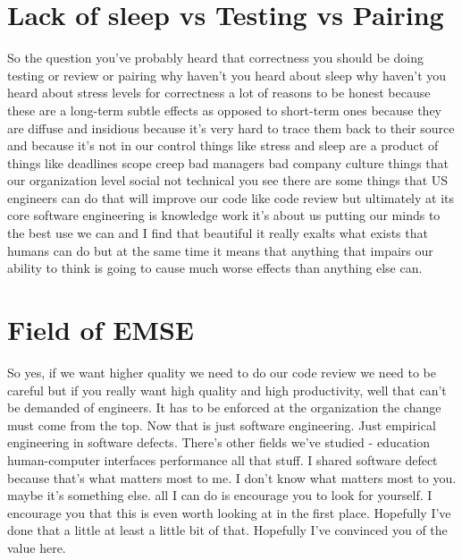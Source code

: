 \documentclass[conference, compsoc, twoside]{IEEEtran}
\begin{document}
\section{Lack of sleep vs Testing vs Pairing}
So the question you've probably heard that correctness you should be doing testing or review or pairing why haven't you heard about sleep why haven't you heard about stress levels for correctness a lot of reasons to be honest because these are a long-term subtle effects as opposed to short-term ones because they are diffuse and insidious because it's very hard to trace them back to their source and because it's not in our control things like stress and sleep are a product of things like deadlines scope creep bad managers bad company culture things that our organization level social not technical you see there are some things that US engineers can do that will improve our code like code review but ultimately at its core software engineering is knowledge work it's about us putting our minds to the best use we can and I find that beautiful it really exalts what exists that humans can do but at the same time it means that anything that impairs our ability to think is going to cause much worse effects than anything else can.

\section{Field of EMSE}
So yes, if we want higher quality we need to do our code review we need to be careful but if you really want high quality and high productivity, well that can't be demanded of engineers.
It has to be enforced at the organization the change must come from the top. Now that is just software engineering.
Just empirical engineering in software defects.
There's other fields we've studied - education human-computer interfaces performance all that stuff. 
I shared software defect because that's
what matters most to me.
I don't know what matters most to you. 
maybe it's something else.
all I can do is encourage you to look for yourself.
I encourage you that this is even worth looking at in the first place.
Hopefully I've done that a little at least a little bit of that.
Hopefully I've convinced you of the value here. 
\end{document}
